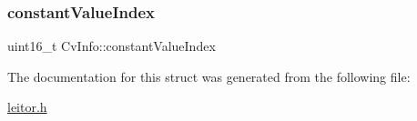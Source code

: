 \subsubsection{\texorpdfstring{constant\+Value\+Index}{constantValueIndex}}
{\footnotesize\ttfamily uint16\+\_\+t Cv\+Info\+::constant\+Value\+Index}



The documentation for this struct was generated from the following file\+:\begin{DoxyCompactItemize}
\item 
\hyperlink{leitor_8h}{leitor.\+h}\end{DoxyCompactItemize}
